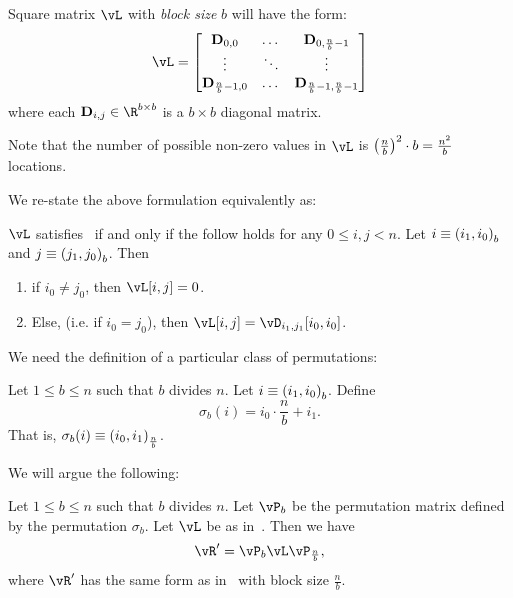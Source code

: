 \begin{definition}\label{def:Matrix L}
Square matrix $\vL$ with {\em block size} $b$ will have the form: 
    \begin{equation}
        	\label{eq:def-L}
    \vL=
    	\begin{bmatrix}
    		\mx{D}_{0,0} & \dots & \mx{D}_{0,\frac{n}{b} -1} \\
    		\vdots & \ddots & \vdots \\
    		\mx{D}_{\frac{n}{b} -1,0} & \dots & \mx{D}_{\frac{n}{b} -1,\frac{n}{b} -1}
    	\end{bmatrix}
    \end{equation}
    where each $\mx{D}_{i,j}\in\R^{b\times b}$ is a $b \times b$ diagonal matrix.
\end{definition}
Note that the number of possible non-zero values in $\vL$ is $\left( {\frac nb}\right)^2\cdot b=\frac{n^2}b$ locations.



We re-state the above formulation equivalently as:
\begin{proposition}
\label{prop:L-eqv-def}
$\vL$ satisfies~ if and only if the follow holds for any
$0\le i,j< n$. Let $i\equiv\left( {{i_1},{i_0}}\right)_{{b}}$ and $j\equiv\left( {{j_1},{j_0}}\right)_{{b}}$. Then 
\begin{enumerate}
    \item\label{item:zero-loc-L} if $i_0\ne j_0$, then $\vL[i,j]=0$. 
    \item \label{item:non-zero-loc-L} Else, (i.e. if $i_0=j_0$), then $\vL[i,j]=\vD_{i_1,j_1}[i_0,i_0]$.
\end{enumerate}
\end{proposition}


We need the definition of a particular class of permutations:
\begin{definition}
\label{def:sigma-b}
Let $1\le b\le n$ such that $b$ divides $n$.  Let $i\equiv\left( {{i_1},{i_0}}\right)_{{b}}$. Define
    \begin{equation}
            \label{eq:sigma_b-def}
        \sigma_b(i) = i_0\cdot\frac{n}{b} + i_1.
    \end{equation}
That is, $\sigma_{b}(i)\equiv \left( {{i_0},{i_1}}\right)_{{\frac {n}{b}}}$.
\end{definition}


We will argue the following:
\begin{theorem} Let $1\le b\le n$ such that $b$ divides $n$.
Let $\vP_b$ be the permutation matrix defined by the permutation $\sigma_b$. Let $\vL$ be as in~. Then we have
\[\vR'=\vP_b\vL\vP_{\frac nb},\]
where $\vR'$ has the same form as in~  with block size $\frac nb$.
\end{theorem}


